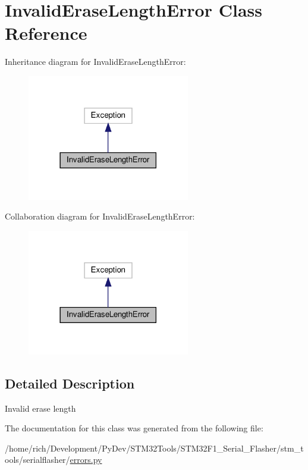 \hypertarget{classstm__tools_1_1serialflasher_1_1errors_1_1InvalidEraseLengthError}{}\section{Invalid\+Erase\+Length\+Error Class Reference}
\label{classstm__tools_1_1serialflasher_1_1errors_1_1InvalidEraseLengthError}


Inheritance diagram for Invalid\+Erase\+Length\+Error\+:
\nopagebreak
\begin{figure}[H]
\begin{center}
\leavevmode
\includegraphics[width=201pt]{classstm__tools_1_1serialflasher_1_1errors_1_1InvalidEraseLengthError__inherit__graph}
\end{center}
\end{figure}


Collaboration diagram for Invalid\+Erase\+Length\+Error\+:
\nopagebreak
\begin{figure}[H]
\begin{center}
\leavevmode
\includegraphics[width=201pt]{classstm__tools_1_1serialflasher_1_1errors_1_1InvalidEraseLengthError__coll__graph}
\end{center}
\end{figure}


\subsection{Detailed Description}
\begin{DoxyVerb}Invalid erase length\end{DoxyVerb}
 

The documentation for this class was generated from the following file\+:\begin{DoxyCompactItemize}
\item 
/home/rich/\+Development/\+Py\+Dev/\+S\+T\+M32\+Tools/\+S\+T\+M32\+F1\+\_\+\+Serial\+\_\+\+Flasher/stm\+\_\+tools/serialflasher/\hyperlink{errors_8py}{errors.\+py}\end{DoxyCompactItemize}
